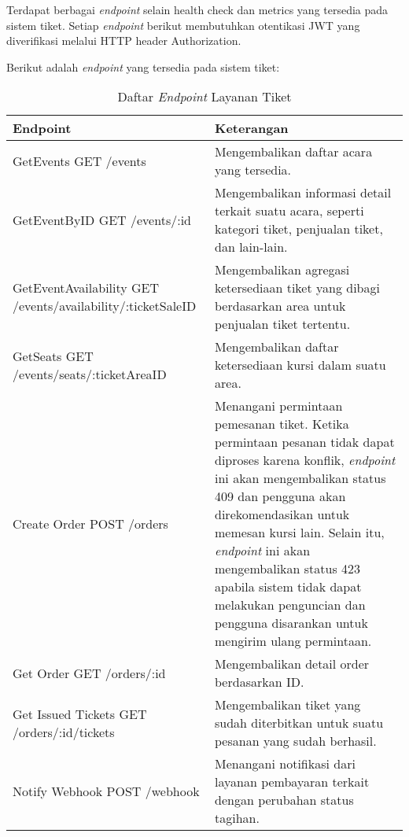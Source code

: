 Terdapat berbagai \textit{endpoint} selain health check dan metrics yang tersedia pada sistem tiket. Setiap \textit{endpoint} berikut membutuhkan otentikasi JWT yang diverifikasi melalui HTTP header Authorization.

Berikut adalah \textit{endpoint} yang tersedia pada sistem tiket:

\pagebreak

\begin{table}[h!]
\centering
\caption{Daftar \textit{Endpoint} Layanan Tiket}
\begin{tabular}{|p{}|p{}|}
\hline
\textbf{Endpoint} & \textbf{Keterangan} \\
\hline
GetEvents \newline GET /events & Mengembalikan daftar acara yang tersedia. \\
\hline
GetEventByID \newline GET /events/:id & Mengembalikan informasi detail terkait suatu acara, seperti kategori tiket, penjualan tiket, dan lain-lain. \\
\hline
GetEventAvailability \newline GET /events/availability/:ticketSaleID & Mengembalikan agregasi ketersediaan tiket yang dibagi berdasarkan area untuk penjualan tiket tertentu. \\
\hline
GetSeats \newline GET /events/seats/:ticketAreaID & Mengembalikan daftar ketersediaan kursi dalam suatu area. \\
\hline
Create Order \newline POST /orders & Menangani permintaan pemesanan tiket. Ketika permintaan pesanan tidak dapat diproses karena konflik, \textit{endpoint} ini akan mengembalikan status 409 dan pengguna akan direkomendasikan untuk memesan kursi lain. Selain itu, \textit{endpoint} ini akan mengembalikan status 423 apabila sistem tidak dapat melakukan penguncian dan pengguna disarankan untuk mengirim ulang permintaan. \\
\hline
Get Order \newline GET /orders/:id & Mengembalikan detail order berdasarkan ID. \\
\hline
Get Issued Tickets \newline GET /orders/:id/tickets & Mengembalikan tiket yang sudah diterbitkan untuk suatu pesanan yang sudah berhasil. \\
\hline
Notify Webhook \newline POST /webhook & Menangani notifikasi dari layanan pembayaran terkait dengan perubahan status tagihan. \\
\hline
\end{tabular}
\end{table}

